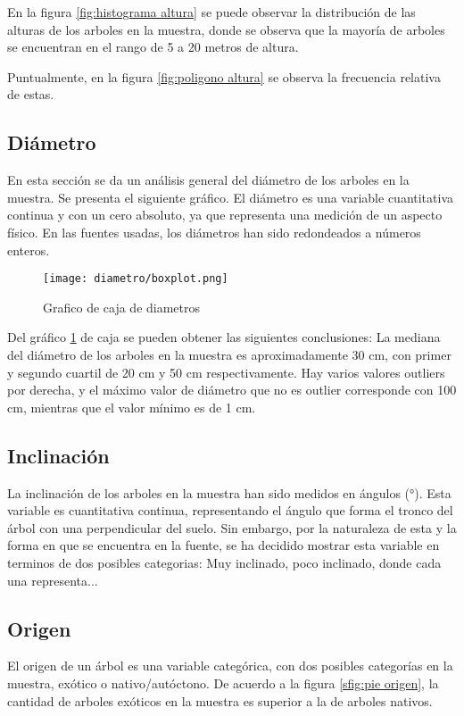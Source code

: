 \documentclass[a4paper]{article}
\begin{document}
En la figura \ref{fig:histograma altura} se puede observar la distribución de las alturas de
los arboles en la muestra, donde se observa que la mayoría de arboles se encuentran en
el rango de 5 a 20 metros de altura.

Puntualmente, en la figura \ref{fig:poligono altura} se observa la frecuencia relativa
de estas.

\subsection{Diámetro}
En esta sección se da un análisis general del diámetro de los arboles en la muestra.
Se presenta el siguiente gráfico. El diámetro es una variable cuantitativa continua y
con un cero absoluto, ya que representa una medición de un aspecto físico. En las fuentes
usadas, los diámetros han sido redondeados a números enteros.

\begin{figure}[H]
    \centering
    \texttt{[image: diametro/boxplot.png]}
    \caption{Grafico de caja de diametros}
    \label{fig:boxplot diametro}
\end{figure}
Del gráfico \ref{fig:boxplot diametro} de caja se pueden obtener las siguientes conclusiones:
La mediana del diámetro de los arboles en la muestra es aproximadamente 30 cm, con primer y
segundo cuartil de 20 cm y 50 cm respectivamente. Hay varios valores outliers por derecha,
y el máximo valor de diámetro que no es outlier corresponde con 100 cm, mientras que el
valor mínimo es de 1 cm.

\subsection{Inclinación}
La inclinación de los arboles en la muestra han sido medidos en ángulos (°). Esta variable
es cuantitativa continua, representando el ángulo que forma el tronco del árbol con una
perpendicular del suelo. Sin embargo, por la naturaleza de esta y la forma en que se
encuentra en la fuente, se ha decidido mostrar esta variable en terminos de dos posibles
categorias: Muy inclinado, poco inclinado, donde cada una representa...

\subsection{Origen}
El origen de un árbol es una variable categórica, con dos posibles categorías en la muestra,
exótico o nativo/autóctono.
De acuerdo a la figura \ref{sfig:pie origen}, la cantidad de arboles exóticos en la muestra es
superior a la de arboles nativos.
\end{document}

